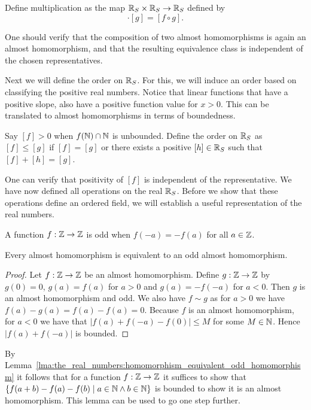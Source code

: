 \documentclass[../main.tex]{subfiles}
\begin{document}
\begin{definition}
    Define multiplication as the map $\mathbb{R}_S\times\mathbb{R}_S\to\mathbb{R}_S$ defined by
    \begin{equation*}
        [f]\cdot[g]=[f\circ g].
    \end{equation*}
\end{definition}
One should verify that the composition of two almost homomorphisms is again an almost homomorphism, and that the resulting equivalence class is independent of the chosen representatives.

Next we will define the order on $\mathbb{R}_S$. For this, we will induce an order based on classifying the positive real numbers. Notice that linear functions that have a positive slope, also have a positive function value for $x>0$. This can be translated to almost homomorphisms in terms of boundedness.
\begin{definition}\label{dfn:the_real_numbers:schanuel_order}
    Say $[f]>0$ when $f(\mathbb{N})\cap\mathbb{N}$ is unbounded. Define the order on $\mathbb{R}_S$ as $[f]\leq[g]$ if $[f]=[g]$ or there exists a positive $[h]\in\mathbb{R}_S$ such that $[f]+[h]=[g]$.
\end{definition}
One can verify that positivity of $[f]$ is independent of the representative. We have now defined all operations on the real $\mathbb{R}_S$. Before we show that these operations define an ordered field, we will establish a useful representation of the real numbers.
\begin{definition}
    A function $f:\mathbb{Z}\to\mathbb{Z}$ is odd when $f(-a)=-f(a)$ for all $a\in\mathbb{Z}$.
\end{definition}
\begin{lemma}\label{lma:the_real_numbers:homomorphism_equivalent_odd_homomorphism}
    Every almost homomorphism is equivalent to an odd almost homomorphism.
\end{lemma}
\begin{proof}
    Let $f:\mathbb{Z}\to\mathbb{Z}$ be an almost homomorphism. Define $g:\mathbb{Z}\to\mathbb{Z}$ by $g(0)=0$, $g(a)=f(a)$ for $a>0$ and $g(a)=-f(-a)$ for $a<0$. Then $g$ is an almost homomorphism and odd. We also have $f\sim g$ as for $a>0$ we have $f(a)-g(a)=f(a)-f(a)=0$. Because $f$ is an almost homomorphism, for $a<0$ we have that $\vert f(a)+f(-a)-f(0)\vert\leq M$ for some $M\in\mathbb{N}$. Hence $\vert f(a)+f(-a)\vert$ is bounded.
\end{proof}
By Lemma~\ref{lma:the_real_numbers:homomorphism_equivalent_odd_homomorphism} it follows that for a function $f:\mathbb{Z}\to\mathbb{Z}$ it suffices to show that $\{f(a+b)-f(a)-f(b)\mid a\in\mathbb{N}\land b\in\mathbb{N}\}$ is bounded to show it is an almost homomorphism. This lemma can be used to go one step further.
\end{document}
